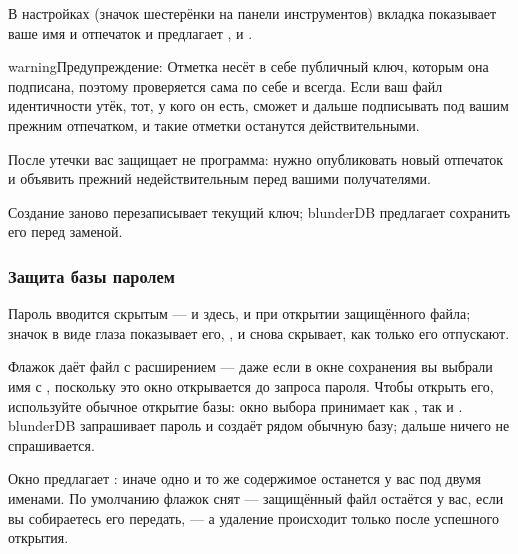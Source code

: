 \documentclass[letterpaper,10pt,russian]{sphinxmanual}
\begin{document}
\sphinxAtStartPar
В настройках (значок шестерёнки на панели инструментов) вкладка  показывает ваше имя и отпечаток и предлагает ,  и .

\begin{sphinxadmonition}{warning}{Предупреждение:}
\sphinxAtStartPar
{} Отметка несёт в себе публичный ключ, которым она подписана, поэтому проверяется сама по себе и всегда. Если ваш файл идентичности утёк, тот, у кого он есть, сможет и дальше подписывать под вашим прежним отпечатком, и такие отметки останутся действительными.

\sphinxAtStartPar
После утечки вас защищает не программа: нужно опубликовать новый отпечаток и объявить прежний недействительным перед вашими получателями.

\sphinxAtStartPar
Создание заново перезаписывает текущий ключ; blunderDB предлагает сохранить его перед заменой.
\end{sphinxadmonition}


\subsubsection{Защита базы паролем}
\label{\detokenize{manuel:proteger-une-base-par-un-mot-de-passe}}
\sphinxAtStartPar
Пароль вводится скрытым — и здесь, и при открытии защищённого файла; значок в виде глаза показывает его, , и снова скрывает, как только его отпускают.

\sphinxAtStartPar
Флажок  даёт файл с расширением  — даже если в окне сохранения вы выбрали имя с , поскольку это окно открывается до запроса пароля. Чтобы открыть его, используйте обычное открытие базы: окно выбора принимает как , так и . blunderDB запрашивает пароль и создаёт рядом обычную базу; дальше ничего не спрашивается.

\sphinxAtStartPar
Окно предлагает : иначе одно и то же содержимое останется у вас под двумя именами. По умолчанию флажок снят — защищённый файл остаётся у вас, если вы собираетесь его передать, — а удаление происходит только после успешного открытия.
\end{document}
